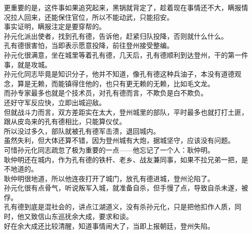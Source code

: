 \begin{multicols}{\theparacolNo}
更重要的是，这件事如果追究起来，黑锅就背定了，趁着现在事情还不大，瞒报情况拉人回来，还能保住官位，所以不能动武，只能招安。\\

事实证明，瞒报注定是要穿帮的。\\

孙元化派出使者，找到孔有德，告诉他，赶紧归队投降，否则就什么什么。\\

孔有德很害怕，当即表示愿意投降，前往登州接受整编。\\

孙元化很满意，坐在城里等着孔有德，几天后，孔有德顺利到达登州，干的第一件事，就是攻城。\\

孙元化同志毕竟是知识分子，他并不知道，像孔有德这种兵油子，本没有道德观念，算是无赖，而能镇得住他的，也只有更无赖的无赖，比如毛文龙。\\

而孙专家最多也就是个技术员，对孔有德而言，不欺负是白不欺负。\\

还好守军反应快，立即出城迎敌。\\

但就战斗力而言，双方差距实在太大，登州城里的部队，平时最多也就打打土匪，跟从皮岛来的孔有德相比，只能算仪仗。\\

所以没过多久，部队就被孔有德军击溃，退回城内。\\

虽然失利，但大体还算不错，因为登州城有大炮，据城坚守，应该没有问题。\\

可惜孙元化同志疏忽了极为重要的一点——他忘记了一个人：耿仲明。\\

耿仲明还在城内，作为孔有德的铁杆、老乡、战友兼同事，如果不拉兄弟一把，是不地道的。\\

耿仲明很地道，所以他连夜打开了城门，放孔有德进城，登州沦陷了。\\

孙元化很有点骨气，听说叛军入城，就准备自杀，但手慢了点，导致自杀未遂，被俘。\\

孔有德到底是混社会的，讲点江湖道义，没有杀孙元化，只是把他扣作人质，同时，他又致信山东巡抚余大成，要求和谈。\\

好在余大成还比较清醒，知道事情闹大了，当即上报朝廷，登州失陷。\\


\end{multicols}
